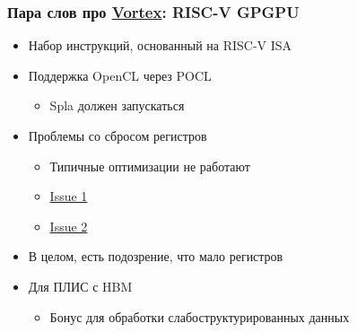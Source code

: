 \documentclass[xcolor=table,aspectratio=169]{beamer}
\begin{document}
\begin{frame}[fragile]
  \frametitle{Пара слов про \href{https://github.com/vortexgpgpu/vortex}{Vortex}: RISC-V GPGPU}
  \begin{itemize}
    \item Набор инструкций, основанный на RISC-V ISA
    \item Поддержка OpenCL через POCL 
    \begin{itemize}
      \item[\faGears] Spla должен запускаться
    \end{itemize}
    \item Проблемы со сбросом регистров
    \begin{itemize}
      \item Типичные оптимизации не работают
      \item \href{https://github.com/vortexgpgpu/vortex/issues/251}{Issue 1}
      \item \href{https://github.com/vortexgpgpu/vortex/issues/205}{Issue 2}
    \end{itemize}
    \item В целом, есть подозрение, что мало регистров
    \item Для ПЛИС с HBM
    \begin{itemize}
      \item[\faQuestion] Бонус для обработки слабоструктурированных данных
    \end{itemize}
  \end{itemize}
\end{frame}
\end{document}
